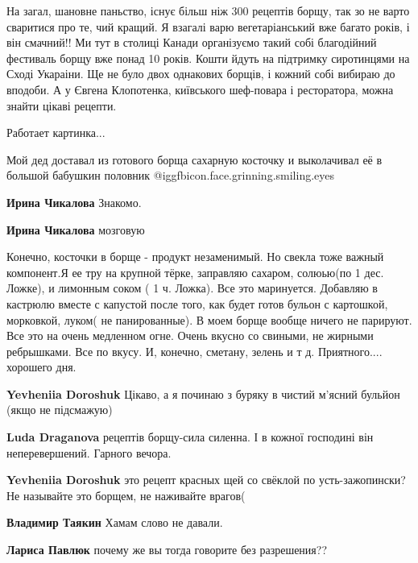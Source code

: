 \begin{itemize}

На загал, шановне паньство, існує більш ніж 300 рецептів борщу, так зо не варто
сваритися про те, чий кращий. Я взагалі варю вегетаріанський вже багато років,
і він смачний!! Ми тут в столиці Канади організуємо такий собі благодійний
фестиваль борщу вже понад 10 років. Кошти йдуть на підтримку сиротинцями на
Сході Укараіни. Ще не було двох однакових борщів, і кожний собі вибираю до
вподоби. А у Євгена Клопотенка, київського шеф-повара і ресторатора, можна
знайти цікаві рецепти.


Работает картинка...


Мой дед доставал из готового борща сахарную косточку и выколачивал её в большой
бабушкин половник @igg{fbicon.face.grinning.smiling.eyes} 

\begin{itemize} %
\textbf{Ирина Чикалова} Знакомо.

\textbf{Ирина Чикалова} мозговую
\end{itemize} %


Конечно, косточки в борще - продукт незаменимый. Но свекла тоже важный
компонент.Я ее тру на крупной тёрке, заправляю сахаром, солюью(по 1 дес.
Ложке), и лимонным соком ( 1 ч. Ложка). Все это маринуется. Добавляю в кастрюлю
вместе с капустой после того, как будет готов бульон с картошкой, морковкой,
луком( не панированные). В моем борще вообще ничего не парируют. Все это на
очень медленном огне. Очень вкусно со свиными, не жирными ребрышками. Все по
вкусу. И, конечно, сметану, зелень и т д. Приятного.... хорошего дня.

\begin{itemize} %
\textbf{Yevheniia Doroshuk} Цікаво, а я починаю з буряку в чистий м’ясний бульйон (якщо не підсмажую)

\textbf{Luda Draganova} рецептів борщу-сила силенна. І в кожної господині він неперевершений. Гарного вечора.

\textbf{Yevheniia Doroshuk} это рецепт красных щей со свёклой по усть-зажопински? Не называйте это борщем, не наживайте врагов(

\textbf{Владимир Таякин} Хамам слово не давали.

\textbf{Лариса Павлюк} почему же вы тогда говорите без разрешения??
\end{itemize} %


\end{itemize}

